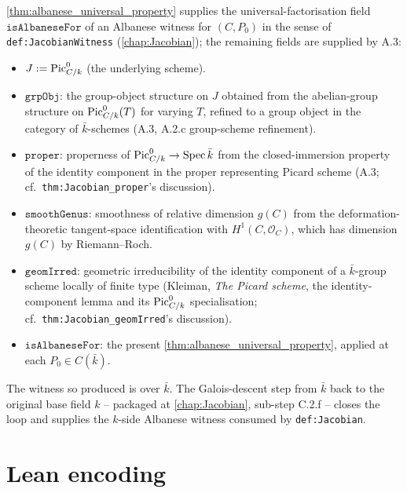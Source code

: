 \cref{thm:albanese_universal_property} supplies the universal-factorisation
field \(\texttt{isAlbaneseFor}\) of an Albanese witness for \((C, P_0)\) in the
sense of \texttt{def:JacobianWitness} (\cref{chap:Jacobian}); the remaining
fields are supplied by A.3:
\begin{itemize}
  \item \(J := \operatorname{Pic}^0_{C/k}\) (the underlying scheme).
  \item \(\texttt{grpObj}\): the group-object structure on \(J\) obtained from the
    abelian-group structure on \(\operatorname{Pic}^0_{C/k}(T)\) for varying \(T\), refined to a
    group object in the category of \(\bar k\)-schemes (A.3, A.2.c group-scheme
    refinement).
  \item \(\texttt{proper}\): properness of \(\operatorname{Pic}^0_{C/k} \to \operatorname{Spec} \bar k\) from
    the closed-immersion property of the identity component in the proper
    representing Picard scheme (A.3; cf.\
    \texttt{thm:Jacobian_proper}'s discussion).
  \item \(\texttt{smoothGenus}\): smoothness of relative dimension \(g(C)\) from
    the deformation-theoretic tangent-space identification with \(H^1(C,
    \mathcal O_C)\), which has dimension \(g(C)\) by Riemann--Roch.
  \item \(\texttt{geomIrred}\): geometric irreducibility of the identity
    component of a \(\bar k\)-group scheme locally of finite type (Kleiman,
    \emph{The Picard scheme}, the identity-component lemma and its
    \(\operatorname{Pic}^0_{C/k}\) specialisation; cf.\
    \texttt{thm:Jacobian_geomIrred}'s discussion).
  \item \(\texttt{isAlbaneseFor}\): the present
    \cref{thm:albanese_universal_property}, applied at each
    \(P_0 \in C(\bar k)\).
\end{itemize}

The witness so produced is over \(\bar k\). The Galois-descent step from \(\bar
k\) back to the original base field \(k\) -- packaged at
\cref{chap:Jacobian}, sub-step C.2.f -- closes the loop and supplies the
\(k\)-side Albanese witness consumed by \texttt{def:Jacobian}.

\section{Lean encoding}
\label{sec:albaneseup_lean_encoding}

